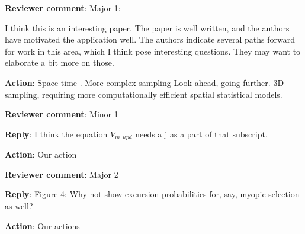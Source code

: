 \documentclass[a4paper]{article}
\def\revcom{\textbf{Reviewer comment}}
\def\reply{\textbf{Reply}}
\def\action{\textbf{Action}}
\begin{document}
\begin{answers}

\item{\revcom : Major 1:}\label{r3c1}

I think this is an interesting paper. The paper is well written, 
and the authors have motivated the application well. 
The authors indicate several paths forward for work in this area, which I think pose interesting questions. They may want to elaborate a bit more on those.

\action: Space-time \cite{sigrist2015stochastic,richardson2017sparsity}. More complex sampling Look-ahead, going further. 3D sampling, requiring more computationally efficient spatial statistical models. 

\item{\revcom : Minor 1}\label{r3c2}

\reply: I think the equation $V_{m,upd}$ needs a j as a part of that subscript.

\action: Our action

\item{\revcom : Major 2}\label{r3c3}

\reply: Figure 4: Why not show excursion probabilities for, say, myopic selection as well?

\action: Our actions

\end{answers}


\footnotesize



\end{document}
